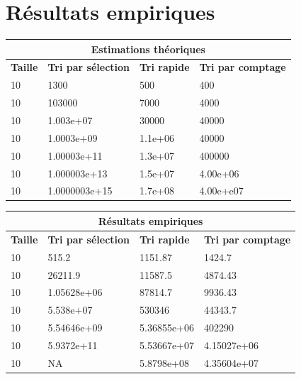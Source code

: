 \documentclass[11pt]{article}
\begin{document}
\section*{Résultats empiriques}

\begin{tabular}{|l l l l|}
  \hline
  \multicolumn{4}{|c|}{\textbf{Estimations théoriques}}\footnotemark \\
  \hline
  \textbf{Taille} & \textbf{Tri par sélection} & \textbf{Tri rapide}&  \textbf{Tri par comptage} \\
  \hline
10\up{1}& 1300          & 500     & 400       \\
10\up{2}& 103000        & 7000    & 4000      \\
10\up{3}& 1.003e+07     & 30000   & 40000     \\
10\up{4}& 1.0003e+09    & 1.1e+06 & 40000     \\
10\up{5}& 1.00003e+11   & 1.3e+07 & 400000    \\
10\up{6}& 1.000003e+13  & 1.5e+07 & 4.00e+06  \\
10\up{7}& 1.0000003e+15 & 1.7e+08 & 4.00e+e07 \\
\hline
\end{tabular}

\medskip

\begin{tabular}{|l l l l|}
\hline
\multicolumn{4}{|c|}{\textbf{Résultats empiriques}} \\
\hline
\textbf{Taille} & \textbf{Tri par sélection} & \textbf{Tri rapide}&  \textbf{Tri par comptage} \\
\hline
10\up{1} & 515.2       & 1151.87     & 1424.7  \\
10\up{2} & 26211.9     & 11587.5     & 4874.43  \\
10\up{3} & 1.05628e+06 & 87814.7     & 9936.43  \\
10\up{4} & 5.538e+07   & 530346      & 44343.7  \\
10\up{5} & 5.54646e+09 & 5.36855e+06 & 402290  \\
10\up{6} & 5.9372e+11  & 5.53667e+07 & 4.15027e+06  \\
10\up{7} & NA          & 5.8798e+08  & 4.35604e+07  \\
\hline
\end{tabular}

\medskip
\end{document}
